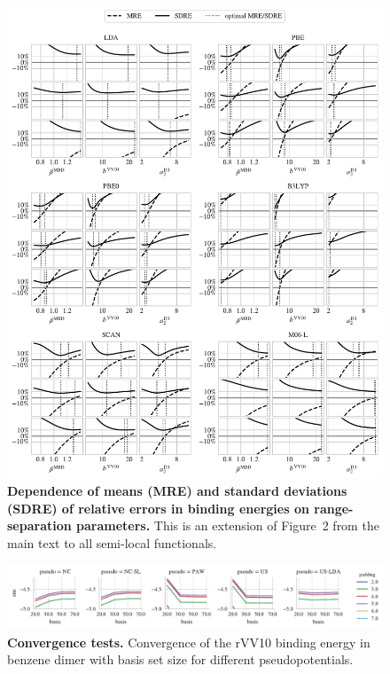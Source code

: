 \documentclass[twocolumn]{article}
\begin{document}
\begin{figure}
\includegraphics[center]{media/param-fitting-all}
\caption{\textbf{Dependence of means (MRE) and standard deviations (SDRE) of relative errors in binding energies on range-separation parameters.}
This is an extension of Figure~2 from the main text to all semi-local functionals.
}\label{fig:param-fitting-all}
\end{figure}

\begin{figure}
\includegraphics[center]{media/bz-tests-padding-basis}
\caption{\textbf{Convergence tests.}
Convergence of the rVV10 binding energy in benzene dimer with basis set size for different pseudopotentials.
}\label{fig:bz-tests-padding-basis}
\end{figure}

\begingroup
\renewcommand{\section}[2]{}
\setlength\bibsep{0pt}
\footnotesize

\endgroup
\end{document}

